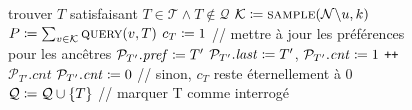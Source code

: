 \begin{figure}
\begin{center}
\small
\begin{algorithmic}[1]
        \While {\codetrue}
            \State\textrm{trouver  $T$ satisfaisant }%
            $T \in \mathcal{T} \land T \notin \mathcal{Q}$
            \State $\mathcal{K} \assign \Call{sample}{\mathcal{N}\backslash u, k}$
            \State $P \assign \sum_{v \in \mathcal{K}}\Call{query}{v, T}$
                \State $c_T \coloneqq 1$
            \State\textrm{// mettre à jour les préférences pour les ancêtres}
                    \State $\mathcal{P}_{T'}\mathit{.pref} \coloneqq T'$
                \EndIf
                    \State $\mathcal{P}_{T'}\mathit{.last} \coloneqq T'$, $\mathcal{P}_{T'}\mathit{.cnt} \coloneqq 1$
                \Else
                    \State \texttt{++}$\mathcal{P}_{T'}\mathit{.cnt}$
                \EndIf
            \EndFor
            \Else
                    \State$\mathcal{P}_{T'}\mathit{.cnt} \coloneqq 0$
            \EndFor
            \EndIf
            \State\textrm{// sinon, }$c_T$\textrm{ reste éternellement à 0}
            \State $\mathcal{Q} \coloneqq \mathcal{Q} \cup \{T\}$ \hspace {1ex} \textrm{// marquer T comme interrogé}
        \EndWhile
    \EndProcedure
    \label{fig:gossipchain-main}
\end{algorithmic}
\end{center}
\end{figure}

